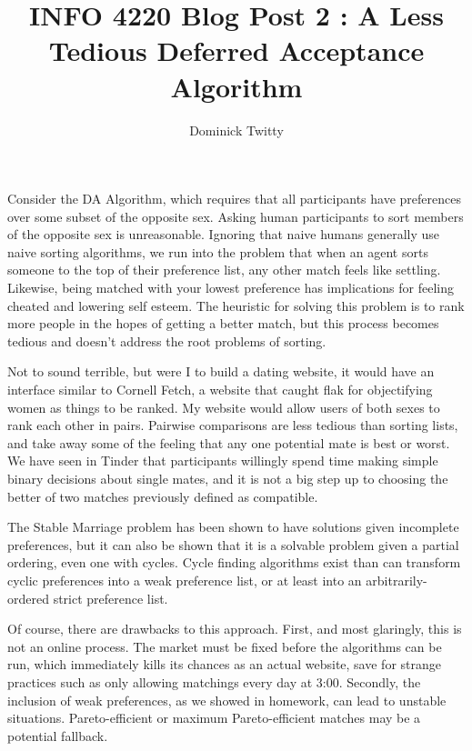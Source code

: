 \documentclass[12pt]{article}
\begin{document}
\title{INFO 4220 Blog Post 2 : A Less Tedious Deferred Acceptance Algorithm}
\author{Dominick Twitty}
\date{}
\maketitle

Consider the DA Algorithm, which requires that all participants have preferences over some subset of the opposite sex. Asking human participants to sort members of the opposite sex is unreasonable. Ignoring that naive humans generally use naive sorting algorithms, we run into the problem that when an agent sorts someone to the top of their preference list, any other match feels like settling. Likewise, being matched with your lowest preference has implications for feeling cheated and lowering self esteem. The heuristic for solving this problem is to rank more people in the hopes of getting a better match, but this process becomes tedious and doesn't address the root problems of sorting.

Not to sound terrible, but were I to build a dating website, it would have an interface similar to Cornell Fetch, a website that caught flak for objectifying women as things to be ranked. My website would allow users of both sexes to rank each other in pairs. Pairwise comparisons are less tedious than sorting lists, and take away some of the feeling that any one potential mate is best or worst. We have seen in Tinder that participants willingly spend time making simple binary decisions about single mates, and it is not a big step up to choosing the better of two matches previously defined as compatible.

The Stable Marriage problem has been shown to have solutions given incomplete preferences, but it can also be shown that it is a solvable problem given a partial ordering, even one with cycles. Cycle finding algorithms exist than can transform cyclic preferences into a weak preference list, or at least into an arbitrarily-ordered strict preference list. 

Of course, there are drawbacks to this approach. First, and most glaringly, this is not an online process. The market must be fixed before the algorithms can be run, which immediately kills its chances as an actual website, save for strange practices such as only allowing matchings every day at 3:00. Secondly, the inclusion of weak preferences, as we showed in homework, can lead to unstable situations. Pareto-efficient or maximum Pareto-efficient matches may be a potential fallback.
\end{document}
